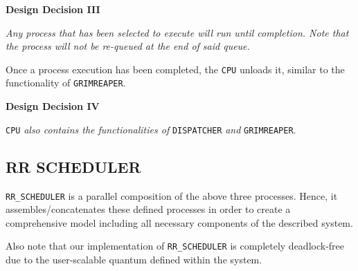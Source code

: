 \documentclass[]{article}
\begin{document}
\begin{mdframed}[backgroundcolor=lightgray!40]
	\textbf{Design Decision III} \par 
	\textit{Any process that has been selected to execute will run until completion. Note that the process will not be re-queued at the end of said queue.}
\end{mdframed}

\vspace{2mm}

Once a process execution has been completed, the \verb|CPU| unloads it, similar to the functionality of \verb|GRIMREAPER|. 

\vspace{2mm}

\begin{mdframed}[backgroundcolor=lightgray!40]
	\textbf{Design Decision IV} \par 
	\verb|CPU| \textit{also contains the functionalities of} \verb|DISPATCHER| \textit{and} \verb|GRIMREAPER|.
\end{mdframed}

\subsection*{RR SCHEDULER}
\verb|RR_SCHEDULER| is a parallel composition of the above three processes. Hence, it assembles/concatenates these defined processes in order to create a comprehensive model including all necessary components of the described system. \par \vspace{2mm}
Also note that our implementation of \verb|RR_SCHEDULER| is completely deadlock-free due to the user-scalable quantum defined within the system.
\end{document}
